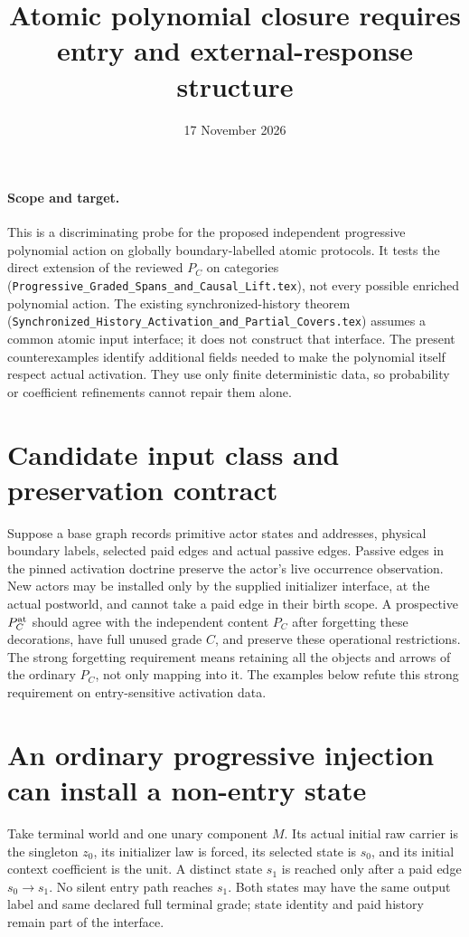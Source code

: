 \documentclass[11pt]{article}
\title{Atomic polynomial closure requires entry and external-response structure}
\date{17 November 2026}
\begin{document}
\maketitle
\paragraph{Scope and target.} This is a discriminating probe for the proposed independent progressive polynomial action on globally boundary-labelled atomic protocols. It tests the direct extension of the reviewed $P_C$ on categories (\texttt{Progressive\_Graded\_Spans\_and\_Causal\_Lift.tex}), not every possible enriched polynomial action. The existing synchronized-history theorem (\texttt{Synchronized\_History\_Activation\_and\_Partial\_Covers.tex}) assumes a common atomic input interface; it does not construct that interface. The present counterexamples identify additional fields needed to make the polynomial itself respect actual activation. They use only finite deterministic data, so probability or coefficient refinements cannot repair them alone.

\section{Candidate input class and preservation contract}
Suppose a base graph records primitive actor states and addresses, physical boundary labels, selected paid edges and actual passive edges. Passive edges in the pinned activation doctrine preserve the actor's live occurrence observation. New actors may be installed only by the supplied initializer interface, at the actual postworld, and cannot take a paid edge in their birth scope. A prospective $P_C^{\rm at}$ should agree with the independent content $P_C$ after forgetting these decorations, have full unused grade $C$, and preserve these operational restrictions. The strong forgetting requirement means retaining all the objects and arrows of the ordinary $P_C$, not only mapping into it. The examples below refute this strong requirement on entry-sensitive activation data.

\section{An ordinary progressive injection can install a non-entry state}
Take terminal world and one unary component $M$. Its actual initial raw carrier is the singleton $z_0$, its initializer law is forced, its selected state is $s_0$, and its initial context coefficient is the unit. A distinct state $s_1$ is reached only after a paid edge $s_0\to s_1$. No silent entry path reaches $s_1$. Both states may have the same output label and same declared full terminal grade; state identity and paid history remain part of the interface.
\end{document}
